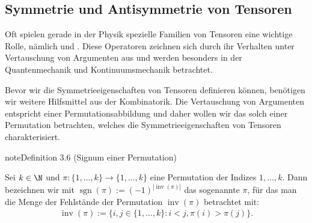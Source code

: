\documentclass[letterpaper,10pt,english]{jupyterBook}
\begin{document}
\subsection{Symmetrie und Antisymmetrie von Tensoren}
\label{\detokenize{vektoranalysis/tensor:symmetrie-und-antisymmetrie-von-tensoren}}\label{\detokenize{vektoranalysis/tensor:s-symtensoren}}
\sphinxAtStartPar
Oft spielen gerade in der Physik spezielle Familien von Tensoren eine wichtige Rolle, nämlich  und .
Diese Operatoren zeichnen sich durch ihr Verhalten unter Vertauschung von Argumenten aus und werden besonders in der Quantenmechanik und Kontinuumsmechanik betrachtet.

\sphinxAtStartPar
Bevor wir die Symmetrieeigenschaften von Tensoren definieren können, benötigen wir weitere Hilfsmittel aus der Kombinatorik.
Die Vertauschung von Argumenten entspricht einer Permutationsabbildung und daher wollen wir das  solch einer Permutation betrachten, welches die Symmetrieeigenschaften von Tensoren charakterisiert.
\label{vektoranalysis/tensor:def:signumPermutation}
\begin{sphinxadmonition}{note}{Definition 3.6 (Signum einer Permutation)}



\sphinxAtStartPar
Sei \(k\in\N\) und \(\pi \colon \lbrace 1,\ldots, k\rbrace \rightarrow \lbrace 1,\ldots, k\rbrace\) eine Permutation der Indizes \(1,\ldots,k\).
Dann bezeichnen wir mit \(\operatorname{sgn}(\pi) := (-1)^{|\operatorname{inv}(\pi)|}\) das sogenannte  \(\pi\), für das man die Menge der Fehlstände der Permutation \(\operatorname{inv}(\pi)\) betrachtet mit:
\begin{equation*}
\begin{split}\operatorname{inv}(\pi) := \lbrace i,j \in \lbrace 1, \ldots, k \rbrace : i < j, \pi(i) > \pi(j) \rbrace.\end{split}
\end{equation*}\end{sphinxadmonition}
\label{vektoranalysis/tensor:remark-26}
\end{document}
